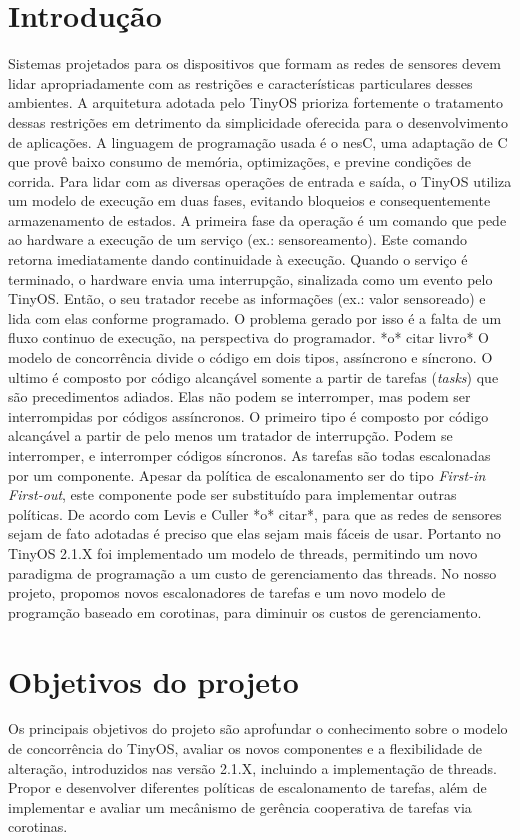 \documentclass[a4paper,onecolumn, 10pt]{article}
\begin{document}
\section{Introdução}\label{intro}
Sistemas projetados para os dispositivos que formam as redes de sensores devem lidar apropriadamente
com as restrições e características particulares desses ambientes. A arquitetura adotada pelo TinyOS 
prioriza fortemente o tratamento dessas restrições em detrimento da simplicidade oferecida
para o desenvolvimento de aplicações. 
A linguagem de programação usada é o nesC, uma adaptação de C que provê baixo consumo de memória, optimizações, e
previne condições de corrida.
Para lidar com as diversas operações de entrada e saída, o TinyOS utiliza um modelo de execução em duas fases, evitando
bloqueios e consequentemente armazenamento de estados. A primeira fase da operação é um comando que pede ao hardware
a execução de um serviço (ex.: sensoreamento). Este comando retorna imediatamente dando continuidade à execução. Quando o
serviço é terminado, o hardware envia uma interrupção, sinalizada como um evento pelo TinyOS. Então, o seu tratador
recebe as informações (ex.: valor sensoreado) e lida com elas conforme programado. O problema gerado por isso é a falta de um fluxo continuo de
execução, na perspectiva do programador. *o* citar livro*
O modelo de concorrência divide o código em dois tipos, assíncrono e síncrono. O ultimo é composto por código
alcançável somente a partir de tarefas (\textit{tasks}) que são precedimentos adiados. Elas não podem se interromper, mas
podem ser interrompidas por códigos assíncronos. O primeiro tipo é composto por código alcançável a partir de pelo menos
um tratador de interrupção. Podem se interromper, e interromper códigos síncronos.
As tarefas são todas escalonadas por um componente. Apesar da política de escalonamento ser do tipo \textit{First-in
First-out}, este componente pode ser substituído para implementar outras políticas.
De acordo com Levis e Culler *o* citar*, para que
as redes de sensores sejam de fato adotadas é preciso que elas sejam mais fáceis de usar. 
Portanto no TinyOS 2.1.X foi implementado um modelo de threads, permitindo um novo paradigma de programação a um custo de
gerenciamento das threads. No nosso projeto, propomos novos escalonadores de tarefas e um novo modelo de programção
baseado em corotinas, para diminuir os custos de gerenciamento.

\section{Objetivos do projeto}\label{objetivos}
Os principais objetivos do projeto são aprofundar o conhecimento sobre o modelo de concorrência do TinyOS, avaliar os
novos componentes e a flexibilidade de alteração, introduzidos nas versão 2.1.X, incluindo a implementação de threads.
Propor e desenvolver diferentes políticas de escalonamento de tarefas, além de implementar e avaliar um mecânismo de
gerência cooperativa de tarefas via corotinas.
\end{document}
